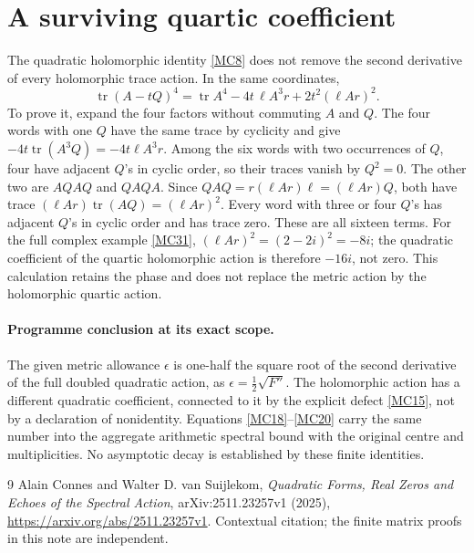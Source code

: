 \documentclass[11pt]{article}
\newcommand{\tr}{\operatorname{tr}}
\begin{document}
\section{A surviving quartic coefficient}

The quadratic holomorphic identity \eqref{MC8} does not remove the second
derivative of every holomorphic trace action. In the same coordinates,
\begin{equation}
 \tr(A-tQ)^4
   =\tr A^4-4t\,\ell A^3r+2t^2(\ell Ar)^2.
 \tag{MC35}\label{MC35}
\end{equation}
To prove it, expand the four factors without commuting \(A\) and \(Q\).
The four words with one \(Q\) have the same trace by cyclicity and give
\(-4t\tr(A^3Q)=-4t\ell A^3r\).
Among the six words with two occurrences of \(Q\), four have adjacent
\(Q\)'s in cyclic order, so their traces vanish by \(Q^2=0\).
The other two are \(AQAQ\) and \(QAQA\). Since
\(QAQ=r(\ell Ar)\ell=(\ell Ar)Q\), both have trace
\((\ell Ar)\tr(AQ)=(\ell Ar)^2\).
Every word with three or four \(Q\)'s has adjacent \(Q\)'s in cyclic
order and has trace zero. These are all sixteen terms.
For the full complex example \eqref{MC31},
\((\ell Ar)^2=(2-2i)^2=-8i\); the quadratic coefficient of the
quartic holomorphic action is therefore \(-16i\), not zero.
This calculation retains the phase and does not replace the metric
action by the holomorphic quartic action.

\paragraph{Programme conclusion at its exact scope.}
The given metric allowance \(\epsilon\) is one-half the square root of
the second derivative of the full doubled quadratic action, as
\(\epsilon=\tfrac12\sqrt{F''}\). The holomorphic action has a different
quadratic coefficient, connected to it by the explicit defect
\eqref{MC15}, not by a declaration of nonidentity. Equations
\eqref{MC18}--\eqref{MC20} carry the same number into the aggregate
arithmetic spectral bound with the original centre and multiplicities.
No asymptotic decay is established by these finite identities.

\begin{thebibliography}{9}
Alain Connes and Walter D. van Suijlekom,
\emph{Quadratic Forms, Real Zeros and Echoes of the Spectral Action},
arXiv:2511.23257v1 (2025),
\url{https://arxiv.org/abs/2511.23257v1}.
Contextual citation; the finite matrix proofs in this note are independent.
\end{thebibliography}
\end{document}
